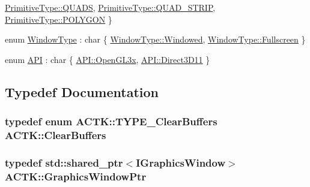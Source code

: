 \begin{DoxyCompactItemize}
\hyperlink{namespace_a_c_t_k_ac879d5bd28581fddd1c876d2103156b8a23d5348dd7bef544d6341bec3480287f}{Primitive\-Type\-::\-Q\-U\-A\-D\-S}, 
\hyperlink{namespace_a_c_t_k_ac879d5bd28581fddd1c876d2103156b8a015958f9763c19119864b58b1e13eae4}{Primitive\-Type\-::\-Q\-U\-A\-D\-\_\-\-S\-T\-R\-I\-P}, 
\hyperlink{namespace_a_c_t_k_ac879d5bd28581fddd1c876d2103156b8aecdc92bf56d960b73b02ee40125758bc}{Primitive\-Type\-::\-P\-O\-L\-Y\-G\-O\-N}
 \}
\item 
enum \hyperlink{namespace_a_c_t_k_a5cb71db6f350f73a1acaf41781bffb5b}{Window\-Type} \-: char \{ \hyperlink{namespace_a_c_t_k_a5cb71db6f350f73a1acaf41781bffb5bab13311ab51c4c34757f67f26580018dd}{Window\-Type\-::\-Windowed}, 
\hyperlink{namespace_a_c_t_k_a5cb71db6f350f73a1acaf41781bffb5ba0829ea6734059d66e6bf87096b215dc1}{Window\-Type\-::\-Fullscreen}
 \}
\item 
enum \hyperlink{namespace_a_c_t_k_a774b0600420b8e9981d6a7d9879011af}{A\-P\-I} \-: char \{ \hyperlink{namespace_a_c_t_k_a774b0600420b8e9981d6a7d9879011afa2cf68778043c0002134b393c93dc029d}{A\-P\-I\-::\-Open\-G\-L3x}, 
\hyperlink{namespace_a_c_t_k_a774b0600420b8e9981d6a7d9879011afa4f8b2c89cfd217fc6a442a2e62b625d1}{A\-P\-I\-::\-Direct3\-D11}
 \}
\end{DoxyCompactItemize}


\subsection{Typedef Documentation}
\hypertarget{namespace_a_c_t_k_ac7a4b20bfb9290a45d05a8086fd0e81e}{
\subsubsection[{Clear\-Buffers}]{\setlength{\rightskip}{0pt plus 5cm}typedef enum {\bf A\-C\-T\-K\-::\-T\-Y\-P\-E\-\_\-\-Clear\-Buffers}  {\bf A\-C\-T\-K\-::\-Clear\-Buffers}}}\label{namespace_a_c_t_k_ac7a4b20bfb9290a45d05a8086fd0e81e}
\hypertarget{namespace_a_c_t_k_a73ab07fc6a568d003d19f3ed14ea7143}{
\subsubsection[{Graphics\-Window\-Ptr}]{\setlength{\rightskip}{0pt plus 5cm}typedef std\-::shared\-\_\-ptr$<${\bf I\-Graphics\-Window}$>$ {\bf A\-C\-T\-K\-::\-Graphics\-Window\-Ptr}}}\label{namespace_a_c_t_k_a73ab07fc6a568d003d19f3ed14ea7143}


